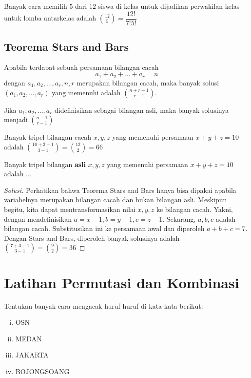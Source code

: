\documentclass[11pt]{scrartcl}
\begin{document}
\begin{example}
    Banyak cara memilih $5$ dari $12$ siswa di kelas untuk dijadikan perwakilan kelas untuk lomba antarkelas adalah $\binom{12}{5} = \dfrac{12!}{7!5!}$
\end{example}

\subsection{Teorema Stars and Bars}
\begin{theorem}
     Apabila terdapat sebuah persamaan bilangan cacah \[a_1 + a_2 + ... + a_r = n\] dengan $a_1, a_2,...,a_r, n, r$ merupakan bilangan cacah, maka banyak solusi $(a_1, a_2, ...,a_r)$ yang memenuhi adalah $\binom{n + r - 1}{r - 1}$.
    
    Jika $a_1, a_2, ..., a_r$ didefinisikan sebagai bilangan asli, maka banyak solusinya menjadi $\binom{n - 1}{r - 1}$
\end{theorem}

\begin{example}
    Banyak tripel bilangan cacah $x, y, z$ yang memenuhi persamaan $x + y + z = 10$ adalah $\binom{10 + 3 - 1}{3 - 1} = \binom{12}{2} = 66$
\end{example}

\begin{example}
    Banyak tripel bilangan \textbf{asli} $x, y, z$ yang memenuhi persamaan $x + y + z = 10$ adalah ...
\end{example}

\begin{proof}[Solusi]
    Perhatikan bahwa Teorema Stars and Bars hanya bisa dipakai apabila variabelnya merupakan bilangan cacah dan bukan bilangan asli. Meskipun begitu, kita dapat mentransformasikan nilai $x, y, z$ ke bilangan cacah. Yakni, dengan mendefinisikan $a = x - 1, b = y - 1, c = z - 1$. Sekarang, $a, b, c$ adalah bilangan cacah. Substitusikan ini ke persamaan awal dan diperoleh $a + b + c = 7$. Dengan Stars and Bars, diperoleh banyak solusinya adalah $\binom{7 + 3 - 1}{3 - 1} = \binom{9}{2} = 36$
\end{proof}

\section{Latihan Permutasi dan Kombinasi}
\begin{problem}
    Tentukan banyak cara mengacak huruf-huruf di kata-kata berikut:
    \begin{enumerate}[i.]
        \item OSN
        \item MEDAN
        \item JAKARTA
        \item BOJONGSOANG
    \end{enumerate}
\end{problem}
\end{document}
